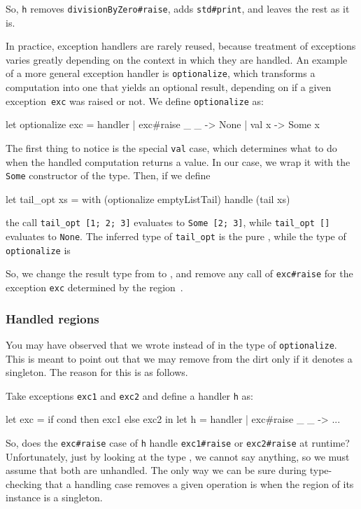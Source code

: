 \documentclass{LMCS}
\let\inline\lstinline
\begin{document}
So, \inline{h} removes \inline{divisionByZero#raise}, adds \inline{std#print}, and leaves the rest as it is.

In practice, exception handlers are rarely reused,
because treatment of exceptions varies greatly
depending on the context in which they are handled.
An example of a more general exception handler is \inline{optionalize},
which transforms a computation into one that yields an optional result,
depending on if a given exception~\inline{exc} was raised or not.
We define \inline{optionalize} as:
\begin{source}
  let optionalize exc =
    handler
    | exc#raise _ _ -> None
    | val x -> Some x
\end{source}
The first thing to notice is the special \inline{val} case,
which determines what to do when the handled computation returns a value.
In our case, we wrap it with the \inline{Some} constructor of the  type.
Then, if we define
\begin{source}
  let tail_opt xs =
    with (optionalize emptyListTail) handle (tail xs)
\end{source}
the call \inline{tail_opt [1; 2; 3]} evaluates to \inline{Some [2; 3]},
while \inline{tail_opt []} evaluates to \inline{None}.
The inferred type of \inline{tail_opt} is the pure ,
while the type of \inline{optionalize} is

So, we change the result type from  to ,
and remove any call of \inline{exc#raise} for the exception \inline{exc} determined by the region~.

\subsubsection{Handled regions}
\label{ssub:handled-regions}

You may have observed that we wrote  instead of  in the type of \inline{optionalize}.
This is meant to point out that we may remove  from the dirt only if it denotes a singleton.
The reason for this is as follows.

Take exceptions \inline{exc1} and \inline{exc2} and define a handler \inline{h} as:
\begin{source}
  let exc = if cond then exc1 else exc2 in
  let h = 
    handler
    | exc#raise _ _ -> ...
\end{source}
So, does the \inline{exc#raise} case of \inline{h} handle \inline{exc1#raise} or \inline{exc2#raise} at runtime?
Unfortunately, just by looking at the type
,
we cannot say anything,
so we must assume that both are unhandled.
The only way we can be sure during type-checking that a handling case removes a given operation is
when the region of its instance is a singleton.
\end{document}
